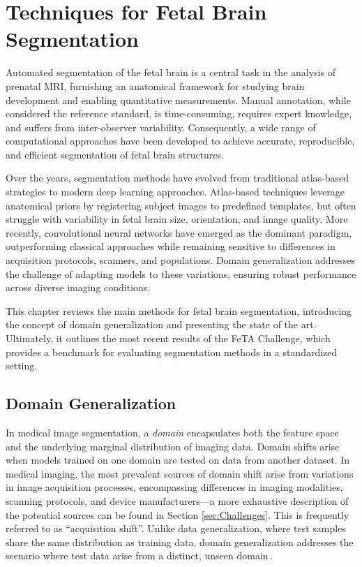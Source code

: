 \chapter{Techniques for Fetal Brain Segmentation} \label{chap:TechniquesForFetalBrainSegmentation}
\vspace{1cm}

Automated segmentation of the fetal brain is a central task in the analysis of prenatal MRI, furnishing an anatomical framework for studying brain development and enabling quantitative measurements. Manual annotation, while considered the reference standard, is time-consuming, requires expert knowledge, and suffers from inter-observer variability. Consequently, a wide range of computational approaches have been developed to achieve accurate, reproducible, and efficient segmentation of fetal brain structures.

Over the years, segmentation methods have evolved from traditional atlas-based strategies to modern deep learning approaches. Atlas-based techniques leverage anatomical priors by registering subject images to predefined templates, but often struggle with variability in fetal brain size, orientation, and image quality. More recently, convolutional neural networks have emerged as the dominant paradigm, outperforming classical approaches while remaining sensitive to differences in acquisition protocols, scanners, and populations. Domain generalization addresses the challenge of adapting models to these variations, ensuring robust performance across diverse imaging conditions.

This chapter reviews the main methods for fetal brain segmentation, introducing the concept of domain generalization and presenting the state of the art. Ultimately, it outlines the most recent results of the FeTA Challenge, which provides a benchmark for evaluating segmentation methods in a standardized setting.

\section{Domain Generalization} \label{sec:DomainGeneralization}
In medical image segmentation, a \emph{domain} encapsulates both the feature space and the underlying marginal distribution of imaging data. Domain shifts arise when models trained on one domain are tested on data from another dataset. In medical imaging, the most prevalent sources of domain shift arise from variations in image acquisition processes, encompassing differences in imaging modalities, scanning protocols, and device manufacturers---a more exhaustive description of the potential sources can be found in Section \ref{sec:Challenges}. This is frequently referred to as \enquote{acquisition shift}. Unlike data generalization, where test samples share the same distribution as training data, domain generalization addresses the scenario where test data arise from a distinct, unseen domain\,\cite{Ouyang2023}.

